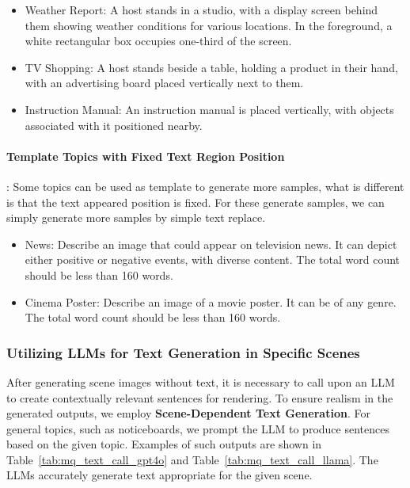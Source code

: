 \begin{itemize}
    \item Weather Report: A host stands in a studio, with a display screen behind them showing weather conditions for various locations. In the foreground, a white rectangular box occupies one-third of the screen.
    \item TV Shopping: A host stands beside a table, holding a product in their hand, with an advertising board placed vertically next to them.
    \item Instruction Manual: An instruction manual is placed vertically, with objects associated with it positioned nearby.
\end{itemize}


\paragraph{Template Topics with Fixed Text Region Position}:
Some topics can be used as template to generate more samples, what is different is that the text appeared position is fixed.
For these generate samples, we can simply generate more samples by simple text replace.

\begin{itemize}
    \item News: Describe an image that could appear on television news. It can depict either positive or negative events, with diverse content. The total word count should be less than 160 words.
    \item Cinema Poster: Describe an image of a movie poster. It can be of any genre. The total word count should be less than 160 words.
\end{itemize}









\subsubsection{Utilizing LLMs for Text Generation in Specific Scenes}


After generating scene images without text, it is necessary to call upon an LLM to create contextually relevant sentences for rendering. 
To ensure realism in the generated outputs, we employ \textbf{Scene-Dependent Text Generation}. 
For general topics, such as noticeboards, we prompt the LLM to produce sentences based on the given topic. 
Examples of such outputs are shown in Table~\ref{tab:mq_text_call_gpt4o} and Table~\ref{tab:mq_text_call_llama}.
The LLMs accurately generate text appropriate for the given scene.



